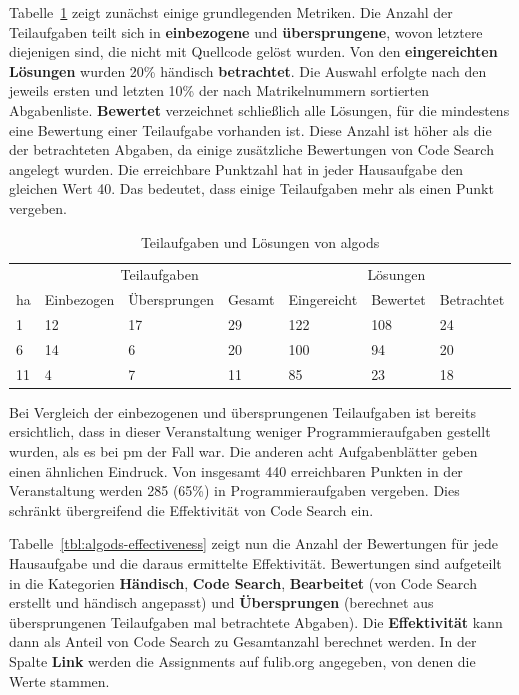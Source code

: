 Tabelle~\ref{tbl:algods-basics} zeigt zunächst einige grundlegenden Metriken.
Die Anzahl der Teilaufgaben teilt sich in \textbf{einbezogene} und \textbf{übersprungene}, wovon letztere diejenigen sind, die nicht mit Quellcode gelöst wurden.
Von den \textbf{eingereichten Lösungen} wurden 20\% händisch \textbf{betrachtet}.
Die Auswahl erfolgte nach den jeweils ersten und letzten 10\% der nach Matrikelnummern sortierten Abgabenliste.
\textbf{Bewertet} verzeichnet schließlich alle Lösungen, für die mindestens eine Bewertung einer Teilaufgabe vorhanden ist.
Diese Anzahl ist höher als die der betrachteten Abgaben, da einige zusätzliche Bewertungen von Code Search angelegt wurden.
Die erreichbare Punktzahl hat in jeder Hausaufgabe den gleichen Wert 40.
Das bedeutet, dass einige Teilaufgaben mehr als einen Punkt vergeben.

\begin{table}
    \centering
    \caption{Teilaufgaben und Lösungen von \ac{algods}}
    \begin{tabular}{|l|l|l|l|l|l|l|}
    \hline
        ~ & \multicolumn{3}{c|}{Teilaufgaben} & \multicolumn{3}{c|}{Lösungen} \\
        \acs{ha} & Einbezogen & Übersprungen & Gesamt & Eingereicht & Bewertet & Betrachtet \\ \hline
        1  & 12 & 17 & 29 & 122 & 108 & 24 \\ \hline
        6  & 14 &  6 & 20 & 100 &  94 & 20 \\ \hline
        11 &  4 &  7 & 11 &  85 &  23 & 18 \\ \hline
    \end{tabular}
    \label{tbl:algods-basics}
\end{table}

Bei Vergleich der einbezogenen und übersprungenen Teilaufgaben ist bereits ersichtlich, dass in dieser Veranstaltung weniger Programmieraufgaben gestellt wurden, als es bei \ac{pm} der Fall war.
Die anderen acht Aufgabenblätter geben einen ähnlichen Eindruck.
Von insgesamt 440 erreichbaren Punkten in der Veranstaltung werden 285 (65\%) in Programmieraufgaben vergeben.
Dies schränkt übergreifend die Effektivität von Code Search ein.

Tabelle~\ref{tbl:algods-effectiveness} zeigt nun die Anzahl der Bewertungen für jede Hausaufgabe und die daraus ermittelte Effektivität.
Bewertungen sind aufgeteilt in die Kategorien \textbf{Händisch}, \textbf{Code Search}, \textbf{Bearbeitet} (von Code Search erstellt und händisch angepasst) und \textbf{Übersprungen} (berechnet aus übersprungenen Teilaufgaben mal betrachtete Abgaben).
Die \textbf{Effektivität} kann dann als Anteil von Code Search zu Gesamtanzahl berechnet werden.
In der Spalte \textbf{Link} werden die Assignments auf fulib.org angegeben, von denen die Werte stammen.

